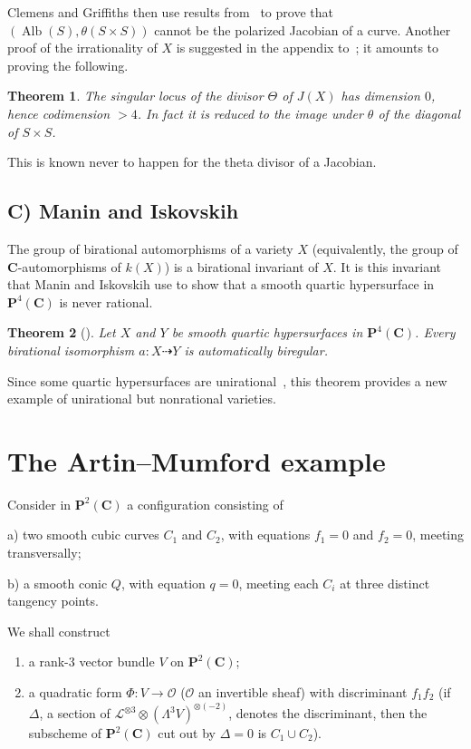 \documentclass[12pt]{amsart}
\theoremstyle{plain}
\newtheorem{theorem}{Theorem}[section]
\theoremstyle{definition}
\theoremstyle{remark}
\DeclareMathOperator{\Alb}{Alb}
\begin{document}
Clemens and Griffiths then use results from~\cite{1} to prove that
$(\Alb(S),\theta(S\times S))$ cannot be the polarized Jacobian of a curve.
Another proof of the irrationality of $X$ is suggested in the appendix to~\cite{4};
it amounts to proving the following.

\begin{theorem}\label{thm:2.5}
The singular locus of the divisor $\Theta$ of $J(X)$ has dimension $0$, hence
codimension $>4$. In fact it is reduced to the image under $\theta$ of the diagonal
of $S\times S$.
\end{theorem}

This is known never to happen for the theta divisor of a Jacobian.

\subsection*{C) Manin and Iskovskih}

The group of birational automorphisms of a variety $X$ (equivalently, the group of
$\mathbf C$-automorphisms of $k(X)$) is a birational invariant of $X$. It is this
invariant that Manin and Iskovskih use to show that a smooth quartic hypersurface
in $\mathbf P^4(\mathbf C)$ is never rational.

\begin{theorem}[\cite{6}]\label{thm:2.6}
Let $X$ and $Y$ be smooth quartic hypersurfaces in $\mathbf P^4(\mathbf C)$. Every
birational isomorphism $a\colon X\dashrightarrow Y$ is automatically biregular.
\end{theorem}

Since some quartic hypersurfaces are unirational~\cite{7}, this theorem provides a
new example of unirational but nonrational varieties.

\section{The Artin--Mumford example}

Consider in $\mathbf P^2(\mathbf C)$ a configuration consisting of

\smallskip
\noindent a) two smooth cubic curves $C_1$ and $C_2$, with equations
$f_1=0$ and $f_2=0$, meeting transversally;

\smallskip
\noindent b) a smooth conic $Q$, with equation $q=0$, meeting each $C_i$ at
three distinct tangency points.

\medskip
We shall construct
\begin{enumerate}
\item[a)] a rank-$3$ vector bundle $V$ on $\mathbf P^2(\mathbf C)$;
\item[b)] a quadratic form $\Phi\colon V\to \mathcal O$ ($\mathcal O$ an invertible
sheaf) with discriminant $f_1f_2$ (if $\Delta$, a section of
$\mathcal L^{\otimes 3}\otimes(\Lambda^3V)^{\otimes(-2)}$, denotes the discriminant, then
the subscheme of $\mathbf P^2(\mathbf C)$ cut out by $\Delta=0$ is $C_1\cup C_2$).
\end{enumerate}
\end{document}
